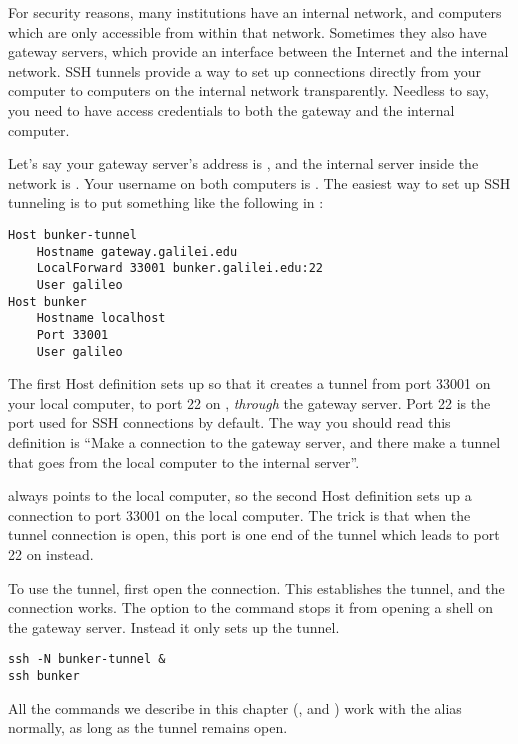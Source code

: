 For security reasons, many institutions have an internal network, and computers
which are only accessible from within that network. Sometimes they also have
gateway servers, which provide an interface between the Internet and the
internal network. SSH tunnels provide a way to set up connections directly from
your computer to computers on the internal network transparently. Needless to
say, you need to have access credentials to both the gateway and the internal
computer.

Let's say your gateway server's address is , and the
internal server inside the network is . Your username
on both computers is . The easiest way to set up SSH tunneling is
to put something like the following in :

\begin{lstlisting}
Host bunker-tunnel
    Hostname gateway.galilei.edu
    LocalForward 33001 bunker.galilei.edu:22
    User galileo
Host bunker
    Hostname localhost
    Port 33001
    User galileo
\end{lstlisting}

The first Host definition sets up  so that it creates a
tunnel from port 33001 on your local computer, to port 22 on
, \emph{through} the gateway server. Port 22 is the
port used for SSH connections by default. The way you should read this
definition is ``Make a connection to the gateway server, and there make a
tunnel that goes from the local computer to the internal server''.

 always points to the local computer, so the second Host
definition sets up a connection to port 33001 on the local computer. The trick
is that when the tunnel connection is open, this port is one end of the tunnel
which leads to port 22 on  instead.

To use the tunnel, first open the  connection. This
establishes the tunnel, and the  connection works. The 
option to the  command stops it from opening a shell on the gateway
server. Instead it only sets up the tunnel.

\begin{lstlisting}
ssh -N bunker-tunnel &
ssh bunker
\end{lstlisting}

All the commands we describe in this chapter (,  and
) work with the  alias normally, as long as the tunnel
remains open.

